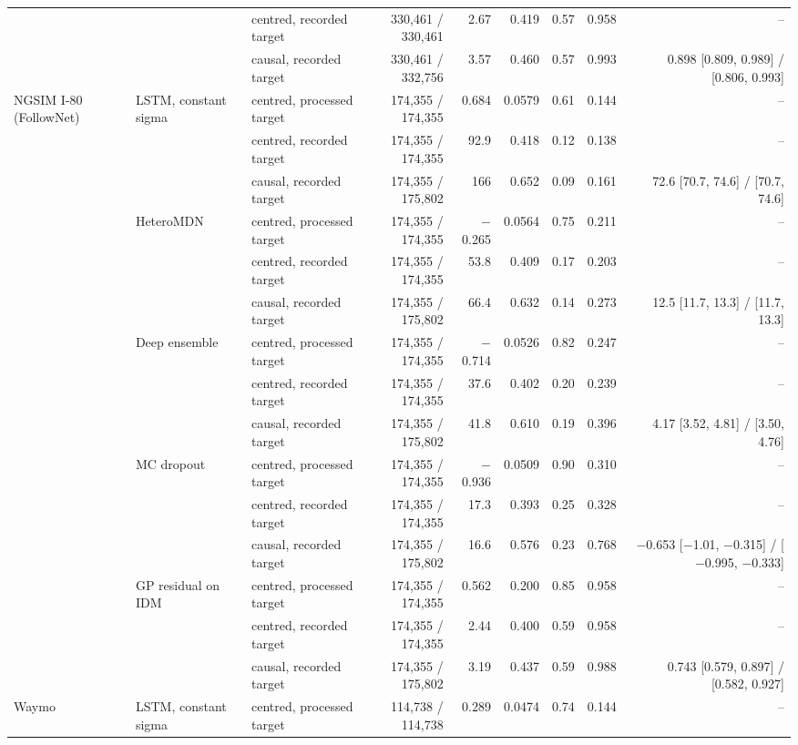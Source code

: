 \begin{longtable}{lllrrrrrr}
 &  & centred, recorded target & 330,461 / 330,461 & 2.67 & 0.419 & 0.57 & 0.958 & -- \\
 &  & causal, recorded target & 330,461 / 332,756 & 3.57 & 0.460 & 0.57 & 0.993 & 0.898 [0.809, 0.989] / [0.806, 0.993] \\
\midrule
NGSIM I-80 (FollowNet) & LSTM, constant sigma & centred, processed target & 174,355 / 174,355 & 0.684 & 0.0579 & 0.61 & 0.144 & -- \\
 &  & centred, recorded target & 174,355 / 174,355 & 92.9 & 0.418 & 0.12 & 0.138 & -- \\
 &  & causal, recorded target & 174,355 / 175,802 & 166 & 0.652 & 0.09 & 0.161 & 72.6 [70.7, 74.6] / [70.7, 74.6] \\
\midrule
 & HeteroMDN & centred, processed target & 174,355 / 174,355 & $-$0.265 & 0.0564 & 0.75 & 0.211 & -- \\
 &  & centred, recorded target & 174,355 / 174,355 & 53.8 & 0.409 & 0.17 & 0.203 & -- \\
 &  & causal, recorded target & 174,355 / 175,802 & 66.4 & 0.632 & 0.14 & 0.273 & 12.5 [11.7, 13.3] / [11.7, 13.3] \\
\midrule
 & Deep ensemble & centred, processed target & 174,355 / 174,355 & $-$0.714 & 0.0526 & 0.82 & 0.247 & -- \\
 &  & centred, recorded target & 174,355 / 174,355 & 37.6 & 0.402 & 0.20 & 0.239 & -- \\
 &  & causal, recorded target & 174,355 / 175,802 & 41.8 & 0.610 & 0.19 & 0.396 & 4.17 [3.52, 4.81] / [3.50, 4.76] \\
\midrule
 & MC dropout & centred, processed target & 174,355 / 174,355 & $-$0.936 & 0.0509 & 0.90 & 0.310 & -- \\
 &  & centred, recorded target & 174,355 / 174,355 & 17.3 & 0.393 & 0.25 & 0.328 & -- \\
 &  & causal, recorded target & 174,355 / 175,802 & 16.6 & 0.576 & 0.23 & 0.768 & $-$0.653 [$-$1.01, $-$0.315] / [$-$0.995, $-$0.333] \\
\midrule
 & GP residual on IDM & centred, processed target & 174,355 / 174,355 & 0.562 & 0.200 & 0.85 & 0.958 & -- \\
 &  & centred, recorded target & 174,355 / 174,355 & 2.44 & 0.400 & 0.59 & 0.958 & -- \\
 &  & causal, recorded target & 174,355 / 175,802 & 3.19 & 0.437 & 0.59 & 0.988 & 0.743 [0.579, 0.897] / [0.582, 0.927] \\
\midrule
Waymo & LSTM, constant sigma & centred, processed target & 114,738 / 114,738 & 0.289 & 0.0474 & 0.74 & 0.144 & -- \\

\end{longtable}
